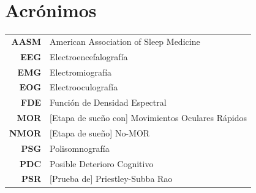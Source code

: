 \documentclass[12pt,letterpaper]{book}
\begin{document}
\chapter*{Acr\'onimos}

\begin{tabular}{rl}
\textbf{AASM} & American Association of Sleep Medicine
\\
\textbf{EEG} & Electroencefalograf\'ia
\\
\textbf{EMG} & Electromiograf\'ia
\\
\textbf{EOG} & Electrooculograf\'ia
\\
\textbf{FDE} & Funci\'on de Densidad Espectral
\\
\textbf{MOR} & [Etapa de sue\~no con] Movimientos Oculares R\'apidos
\\
\textbf{NMOR}& [Etapa de sue\~no] No-MOR
\\
\textbf{PSG} & Polisomnograf\'ia
\\
\textbf{PDC} & Posible Deterioro Cognitivo
\\
\textbf{PSR} & [Prueba de] Priestley-Subba Rao
\\
\end{tabular}

\newpage


\thispagestyle{empty}

\tableofcontents
\newpage


\setcounter{page}{1}

\end{document}
